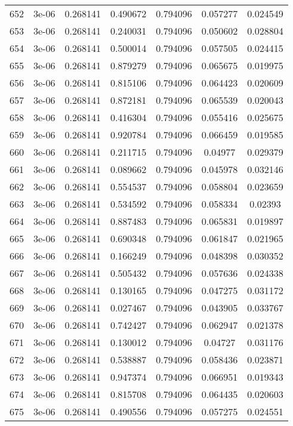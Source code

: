 \begin{table}
\begin{tabular*}{\linewidth}{c|c|c|c|c|c|c}
652 & 3e-06 & 0.268141 & 0.490672 & 0.794096 & 0.057277 & 0.024549\\
653 & 3e-06 & 0.268141 & 0.240031 & 0.794096 & 0.050602 & 0.028804\\
654 & 3e-06 & 0.268141 & 0.500014 & 0.794096 & 0.057505 & 0.024415\\
655 & 3e-06 & 0.268141 & 0.879279 & 0.794096 & 0.065675 & 0.019975\\
656 & 3e-06 & 0.268141 & 0.815106 & 0.794096 & 0.064423 & 0.020609\\
657 & 3e-06 & 0.268141 & 0.872181 & 0.794096 & 0.065539 & 0.020043\\
658 & 3e-06 & 0.268141 & 0.416304 & 0.794096 & 0.055416 & 0.025675\\
659 & 3e-06 & 0.268141 & 0.920784 & 0.794096 & 0.066459 & 0.019585\\
660 & 3e-06 & 0.268141 & 0.211715 & 0.794096 & 0.04977 & 0.029379\\
661 & 3e-06 & 0.268141 & 0.089662 & 0.794096 & 0.045978 & 0.032146\\
662 & 3e-06 & 0.268141 & 0.554537 & 0.794096 & 0.058804 & 0.023659\\
663 & 3e-06 & 0.268141 & 0.534592 & 0.794096 & 0.058334 & 0.02393\\
664 & 3e-06 & 0.268141 & 0.887483 & 0.794096 & 0.065831 & 0.019897\\
665 & 3e-06 & 0.268141 & 0.690348 & 0.794096 & 0.061847 & 0.021965\\
666 & 3e-06 & 0.268141 & 0.166249 & 0.794096 & 0.048398 & 0.030352\\
667 & 3e-06 & 0.268141 & 0.505432 & 0.794096 & 0.057636 & 0.024338\\
668 & 3e-06 & 0.268141 & 0.130165 & 0.794096 & 0.047275 & 0.031172\\
669 & 3e-06 & 0.268141 & 0.027467 & 0.794096 & 0.043905 & 0.033767\\
670 & 3e-06 & 0.268141 & 0.742427 & 0.794096 & 0.062947 & 0.021378\\
671 & 3e-06 & 0.268141 & 0.130012 & 0.794096 & 0.04727 & 0.031176\\
672 & 3e-06 & 0.268141 & 0.538887 & 0.794096 & 0.058436 & 0.023871\\
673 & 3e-06 & 0.268141 & 0.947374 & 0.794096 & 0.066951 & 0.019343\\
674 & 3e-06 & 0.268141 & 0.815708 & 0.794096 & 0.064435 & 0.020603\\
675 & 3e-06 & 0.268141 & 0.490556 & 0.794096 & 0.057275 & 0.024551\\
\end{tabular*}
\end{table}

